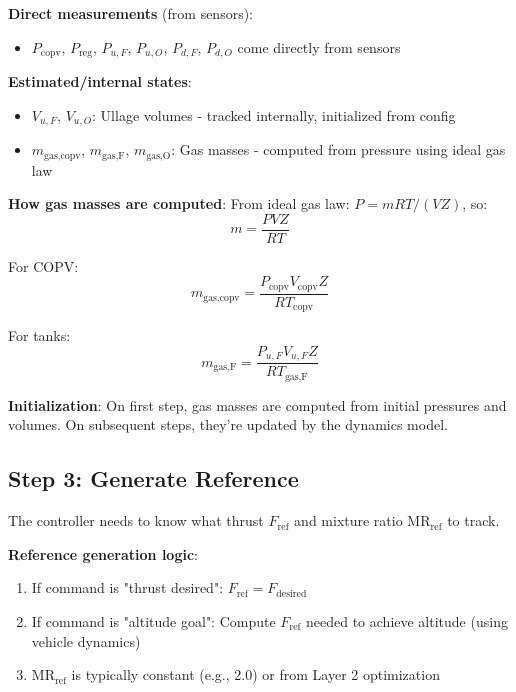\documentclass[11pt,a4paper]{article}
\begin{document}
\textbf{Direct measurements} (from sensors):
\begin{itemize}
    \item $P_{\text{copv}}$, $P_{\text{reg}}$, $P_{u,F}$, $P_{u,O}$, $P_{d,F}$, $P_{d,O}$ come directly from sensors
\end{itemize}

\textbf{Estimated/internal states}:
\begin{itemize}
    \item $V_{u,F}$, $V_{u,O}$: Ullage volumes - tracked internally, initialized from config
    \item $m_{\text{gas,copv}}$, $m_{\text{gas,F}}$, $m_{\text{gas,O}}$: Gas masses - computed from pressure using ideal gas law
\end{itemize}

\textbf{How gas masses are computed}:
From ideal gas law: $P = mRT/(VZ)$, so:
\begin{equation}
m = \frac{PVZ}{RT}
\end{equation}

For COPV:
\begin{equation}
m_{\text{gas,copv}} = \frac{P_{\text{copv}} V_{\text{copv}} Z}{R T_{\text{copv}}}
\end{equation}

For tanks:
\begin{equation}
m_{\text{gas,F}} = \frac{P_{u,F} V_{u,F} Z}{R T_{\text{gas,F}}}
\end{equation}

\textbf{Initialization}: On first step, gas masses are computed from initial pressures and volumes. On subsequent steps, they're updated by the dynamics model.

\subsection{Step 3: Generate Reference}

The controller needs to know what thrust $F_{\text{ref}}$ and mixture ratio $\text{MR}_{\text{ref}}$ to track.

\textbf{Reference generation logic}:
\begin{enumerate}
    \item If command is "thrust desired": $F_{\text{ref}} = F_{\text{desired}}$
    \item If command is "altitude goal": Compute $F_{\text{ref}}$ needed to achieve altitude (using vehicle dynamics)
    \item $\text{MR}_{\text{ref}}$ is typically constant (e.g., 2.0) or from Layer 2 optimization
\end{enumerate}
\end{document}

